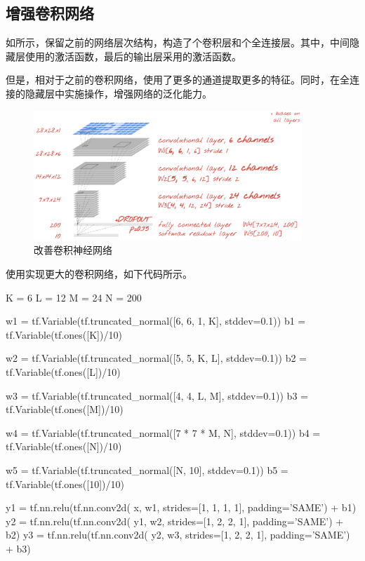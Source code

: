 \begin{content}
\begin{content}
\subsection{增强卷积网络}

如所示，保留之前的网络层次结构，构造了个卷积层和个全连接层。其中，中间隐藏层使用的激活函数，最后的输出层采用的激活函数。

但是，相对于之前的卷积网络，使用了更多的通道提取更多的特征。同时，在全连接的隐藏层中实施操作，增强网络的泛化能力。

\begin{figure}[H]
\centering
\includegraphics[width=0.9\textwidth]{figures/mnist-conv2d-2.png}
\caption{改善卷积神经网络}
 \label{fig:mnist-conv2d-2}
\end{figure}

使用\tf{}实现更大的卷积网络，如下代码所示。

\begin{leftbar}
\begin{python}
K = 6
L = 12
M = 24
N = 200

w1 = tf.Variable(tf.truncated_normal([6, 6, 1, K], stddev=0.1))
b1 = tf.Variable(tf.ones([K])/10)

w2 = tf.Variable(tf.truncated_normal([5, 5, K, L], stddev=0.1))
b2 = tf.Variable(tf.ones([L])/10)

w3 = tf.Variable(tf.truncated_normal([4, 4, L, M], stddev=0.1))
b3 = tf.Variable(tf.ones([M])/10)

w4 = tf.Variable(tf.truncated_normal([7 * 7 * M, N], stddev=0.1))
b4 = tf.Variable(tf.ones([N])/10)

w5 = tf.Variable(tf.truncated_normal([N, 10], stddev=0.1))
b5 = tf.Variable(tf.ones([10])/10)

y1 = tf.nn.relu(tf.nn.conv2d(
       x,  w1, strides=[1, 1, 1, 1], padding='SAME') + b1)
y2 = tf.nn.relu(tf.nn.conv2d(
       y1, w2, strides=[1, 2, 2, 1], padding='SAME') + b2)
y3 = tf.nn.relu(tf.nn.conv2d(
       y2, w3, strides=[1, 2, 2, 1], padding='SAME') + b3)


\end{python}
\end{leftbar}
\end{content}
\end{content}
